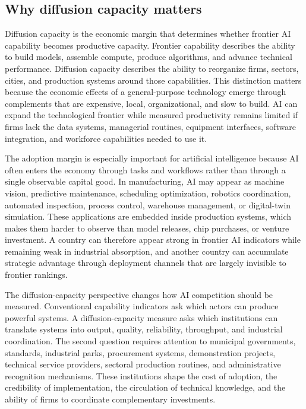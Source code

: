 \subsection{Why diffusion capacity matters}
\label{subsec:diffusion_capacity}

Diffusion capacity is the economic margin that determines whether frontier AI capability becomes productive capacity. Frontier capability describes the ability to build models, assemble compute, produce algorithms, and advance technical performance. Diffusion capacity describes the ability to reorganize firms, sectors, cities, and production systems around those capabilities. This distinction matters because the economic effects of a general-purpose technology emerge through complements that are expensive, local, organizational, and slow to build. AI can expand the technological frontier while measured productivity remains limited if firms lack the data systems, managerial routines, equipment interfaces, software integration, and workforce capabilities needed to use it.

The adoption margin is especially important for artificial intelligence because AI often enters the economy through tasks and workflows rather than through a single observable capital good. In manufacturing, AI may appear as machine vision, predictive maintenance, scheduling optimization, robotics coordination, automated inspection, process control, warehouse management, or digital-twin simulation. These applications are embedded inside production systems, which makes them harder to observe than model releases, chip purchases, or venture investment. A country can therefore appear strong in frontier AI indicators while remaining weak in industrial absorption, and another country can accumulate strategic advantage through deployment channels that are largely invisible to frontier rankings.

The diffusion-capacity perspective changes how AI competition should be measured. Conventional capability indicators ask which actors can produce powerful systems. A diffusion-capacity measure asks which institutions can translate systems into output, quality, reliability, throughput, and industrial coordination. The second question requires attention to municipal governments, standards, industrial parks, procurement systems, demonstration projects, technical service providers, sectoral production routines, and administrative recognition mechanisms. These institutions shape the cost of adoption, the credibility of implementation, the circulation of technical knowledge, and the ability of firms to coordinate complementary investments.

